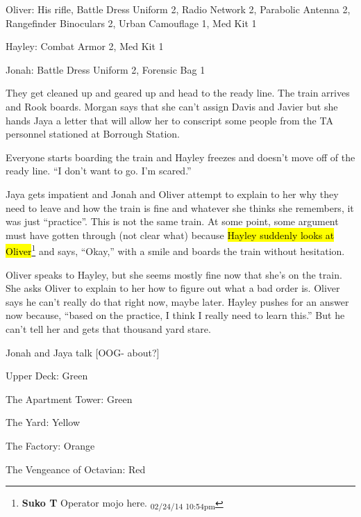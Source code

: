 Oliver: His rifle, Battle Dress Uniform 2, Radio Network 2, Parabolic Antenna 2, Rangefinder Binoculars 2, Urban Camouflage 1, Med Kit 1

Hayley: Combat Armor 2, Med Kit 1

Jonah: Battle Dress Uniform 2, Forensic Bag 1



They get cleaned up and geared up and head to the ready line.  The train arrives and Rook boards.  Morgan says that she can't assign Davis and Javier but she hands Jaya a letter that will allow her to conscript some people from the TA personnel stationed at Borrough Station.



Everyone starts boarding the train and Hayley freezes and doesn't move off of the ready line.  ``I don't want to go.  I'm scared.''



Jaya gets impatient and Jonah and Oliver attempt to explain to her why they need to leave and how the train is fine and whatever she thinks she remembers, it was just ``practice''.  This is not the same train.  At some point, some argument must have gotten through (not clear what) because \hl{Hayley suddenly looks at Oliver}\footnote{\textbf{Suko T }Operator mojo here. \textsubscript{02/24/14 10:54pm}} and says, ``Okay,'' with a smile and boards the train without hesitation.



Oliver speaks to Hayley, but she seems mostly fine now that she's on the train.  She asks Oliver to explain to her how to figure out what a bad order is.  Oliver says he can't really do that right now, maybe later.  Hayley pushes for an answer now because, ``based on the practice, I think I really need to learn this.''  But he can't tell her and gets that thousand yard stare.



Jonah and Jaya talk {[}OOG- about?{]}






Upper Deck: Green

The Apartment Tower: Green

The Yard: Yellow

The Factory: Orange

The Vengeance of Octavian: Red



